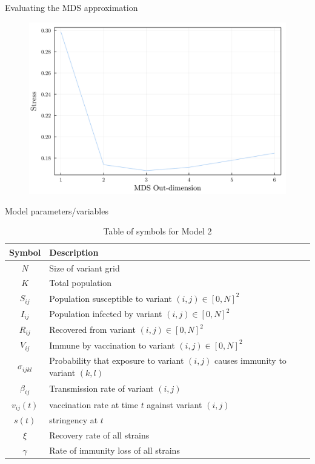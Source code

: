 \documentclass{beamer}
\begin{document}
\begin{frame}{Evaluating the MDS approximation}
    \begin{figure}
        \includegraphics[width=\textwidth]{my_figs/usa_mds_stress.png}
    \end{figure}
\end{frame}
\begin{frame}{Model parameters/variables}
    \begin{table}[h!]
        \begin{center}
        \begin{tabular}{c|p{8cm}}
                Symbol & Description\\
                \hline
                \hline
                $N$ & Size of variant grid \\
                $K$ & Total population \\
                $S_{ij}$ & Population susceptible to variant $(i,j) \in [0,N]^2$ \\
                $I_{ij}$ & Population infected by variant $(i,j) \in [0,N]^2$\\
                $R_{ij}$ & Recovered from variant $(i,j) \in [0,N]^2$\\
                $V_{ij}$ & Immune by vaccination to variant $(i,j) \in [0,N]^2$\\
                $\sigma_{ijkl}$ & Probability that exposure to variant $(i,j)$ causes immunity \newline to variant $(k,l)$\\
                $\beta_{ij}$ & Transmission rate of variant $(i,j)$\\
                $v_{ij}(t)$ & vaccination rate at time $t$ against variant $(i,j)$\\
                $s(t)$ & stringency at $t$\\
                $\xi$ & Recovery rate of all strains \\
                $\gamma$ & Rate of immunity loss of all strains \\
        \end{tabular}
        \caption{Table of symbols for Model 2}
    
        \label{variables_2}
        \end{center}
    \end{table}
\end{frame}
\end{document}

